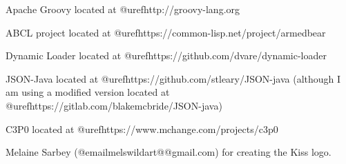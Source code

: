 Apache Groovy located at @uref{http://groovy-lang.org}

ABCL project located at @uref{https://common-lisp.net/project/armedbear}

Dynamic Loader located at @uref{https://github.com/dvare/dynamic-loader}

JSON-Java located at @uref{https://github.com/stleary/JSON-java} (although
I am using a modified version located at @uref{https://gitlab.com/blakemcbride/JSON-java})

C3P0 located at @uref{https://www.mchange.com/projects/c3p0}

Melaine Sarbey (@email{melswildart@@gmail.com}) for creating the Kiss logo.

